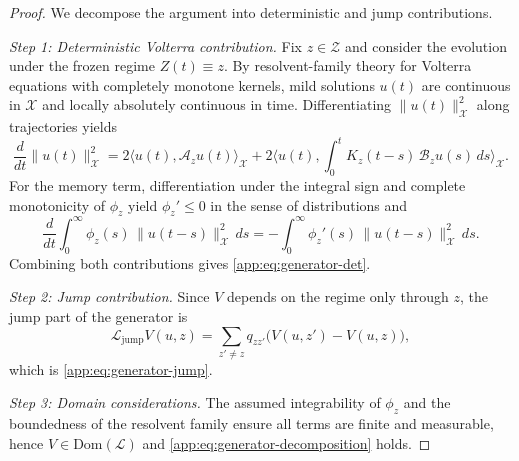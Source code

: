 \documentclass[10pt,a4paper]{amsart}
\begin{document}
	\begin{proof}
		We decompose the argument into deterministic and jump contributions.
		
		\medskip
		\noindent\emph{Step 1: Deterministic Volterra contribution.}
		Fix $z\in\mathcal{Z}$ and consider the evolution under the frozen regime
		$Z(t)\equiv z$.
		By resolvent-family theory for Volterra equations with completely monotone kernels,
		mild solutions $u(t)$ are continuous in $\mathcal{X}$ and locally absolutely
		continuous in time.
		Differentiating $\|u(t)\|_{\mathcal{X}}^2$ along trajectories yields
		\[
		\frac{d}{dt}\|u(t)\|_{\mathcal{X}}^2
		=
		2\langle u(t),\mathcal{A}_z u(t)\rangle_{\mathcal{X}}
		+
		2\Big\langle
		u(t),
		\int_0^t K_z(t-s)\,\mathcal{B}_z u(s)\,ds
		\Big\rangle_{\mathcal{X}}.
		\]
		For the memory term, differentiation under the integral sign and complete
		monotonicity of $\phi_z$ yield $\phi_z'\le 0$ in the sense of distributions and
		\[
		\frac{d}{dt}
		\int_0^\infty \phi_z(s)\,\|u(t-s)\|_{\mathcal{X}}^2\,ds
		=
		-
		\int_0^\infty \phi_z'(s)\,\|u(t-s)\|_{\mathcal{X}}^2\,ds.
		\]
		Combining both contributions gives \eqref{app:eq:generator-det}.
		
		\medskip
		\noindent\emph{Step 2: Jump contribution.}
		Since $V$ depends on the regime only through $z$, the jump part of the generator is
		\[
		\mathcal{L}_{\mathrm{jump}}V(u,z)
		=
		\sum_{z'\neq z} q_{zz'}\big(V(u,z')-V(u,z)\big),
		\]
		which is \eqref{app:eq:generator-jump}.
		
		\medskip
		\noindent\emph{Step 3: Domain considerations.}
		The assumed integrability of $\phi_z$ and the boundedness of the resolvent family
		ensure all terms are finite and measurable, hence $V\in\mathrm{Dom}(\mathcal L)$ and
		\eqref{app:eq:generator-decomposition} holds.
	\end{proof}
\end{document}
